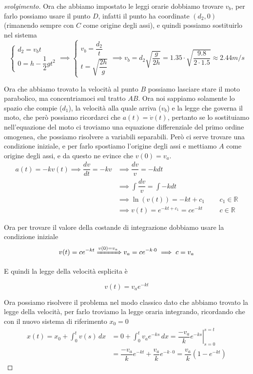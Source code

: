 \documentclass{rapport}
\begin{document}
\begin{proof}[svolgimento]
Ora che abbiamo impostato le leggi orarie dobbiamo trovare $v_b$, per farlo possiamo usare il punto $D$, infatti il punto ha coordinate $(d_2, 0)$ (rimanendo sempre con $C$ come origine degli assi), e quindi possiamo sostituirlo nel sistema
\[
\begin{cases}
  d_2 =   v_{b} t\\
  0 = h - \dfrac{1}{2}gt^2
\end{cases} \implies
\begin{cases}
      v_{b} = \dfrac{d_2}{t}\\[1.2em]
  t =   \sqrt{\dfrac{2h}{g}}
\end{cases}\implies
v_{b} = d_2 \sqrt{\dfrac{g}{2h}} = 1.35 \cdot \sqrt{\dfrac{9.8}{2\cdot 1.5}}  \approx 2.44m/s
\]

Ora che abbiamo trovato la velocità al punto $B$ possiamo lasciare stare il moto parabolico, ma concentriamoci sul tratto $AB$. Ora noi sappiamo solamente lo spazio che compie ($d_1$), la velocità alla quale arriva ($v_b$) e la legge che governa il moto, che però possiamo ricordarci che $a(t) = \dot{v}(t)$, pertanto se lo sostituiamo nell'equazione del moto ci troviamo una equazione differenziale del primo ordine omogenea, che possiamo risolvere a variabili separabili. Però ci serve trovare una condizione iniziale, e per farlo spostiamo l'origine degli assi e mettiamo $A$ come origine degli assi, e da questo ne evince che $v(0)=v_a$.
\begin{align*}
a(t) = -kv(t) \implies \dfrac{dv}{dt} = -kv &\implies \dfrac{dv}{v} = -kdt \\
&\implies \int \dfrac{dv}{v} = \int -kdt  \\
&\implies \ln(v(t)) = -kt + c_1 \;\;\;\;\; &c_1 \in \mathbb{R} \\
&\implies v(t) = e^{-kt+c_1} = ce^{-kt} \;\;\;\;\; &c \in \mathbb{R} 
\end{align*}

Ora per trovare il valore della costande di integrazione dobbiamo usare la condizione iniziale 
\[
v(t) = ce^{-kt} \xRightarrow{v(0) = v_a} v_a = ce^{-k\cdot 0} \implies c=v_a
\]

E quindi la legge della velocità esplicita è 

\[
v(t) = v_a e^{-kt}
\]

Ora possiamo risolvere il problema nel modo classico dato che abbiamo trovato la legge della velocità, per farlo troviamo la legge oraria integrando, ricordando che con il nuovo sistema di riferimento $x_0 = 0$
\begin{align*}
x(t) = x_0 + \int_{0}^{t}v(s)\,dx &=0+ \int_{0}^{t}v_a e^{-ks}\,dx = \left.\dfrac{-v_a}{k}e^{-ks} \right|^{s=t}_{s=0} \\
&= \dfrac{-v_a}{k}e^{-kt} + \dfrac{v_a}{k}e^{-k\cdot 0}  = \dfrac{v_a}{k}\left(1-e^{-kt}\right)
\end{align*}


\end{proof}
\end{document}
